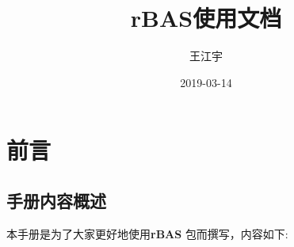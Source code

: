 \documentclass[]{ctexbook}
\title{rBAS使用文档}
\author{王江宇}
\date{2019-03-14}
\begin{document}
\maketitle

{
\setcounter{tocdepth}{2}
\tableofcontents
}
\listoftables
\listoffigures
\mainmatter

\chapter*{前言}


\section*{手册内容概述}


本手册是为了大家更好地使用\textbf{rBAS}
\citep{R-rBAS}包而撰写，内容如下:
\end{document}
